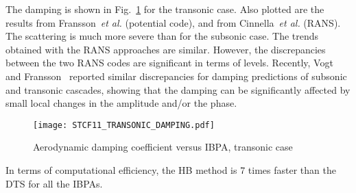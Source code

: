 The damping is shown in Fig.~\ref{fig:stcf11_transonic_damping} for
the transonic case. Also plotted are the results from
Fransson~\emph{et al.} (potential code), and 
from Cinnella~\emph{et al.} (RANS). The scattering is much more severe
than for the subsonic case. The trends obtained with the RANS approaches are similar. However, the
discrepancies between the two RANS codes are significant in terms of
levels.
Recently, Vogt and Fransson~\cite{Vogt:2011fk} reported similar discrepancies 
for damping predictions of subsonic and transonic cascades, 
showing that the damping can be significantly affected by 
small local changes in the amplitude and/or the phase.
\begin{figure}[htb]
  \centering
  \texttt{[image: STCF11\_TRANSONIC\_DAMPING.pdf]}
  \caption{Aerodynamic damping coefficient versus IBPA, transonic
    case}
  \label{fig:stcf11_transonic_damping}
\end{figure}
In terms of computational efficiency, the HB method is 7 times faster
than the DTS  for all the IBPAs.
